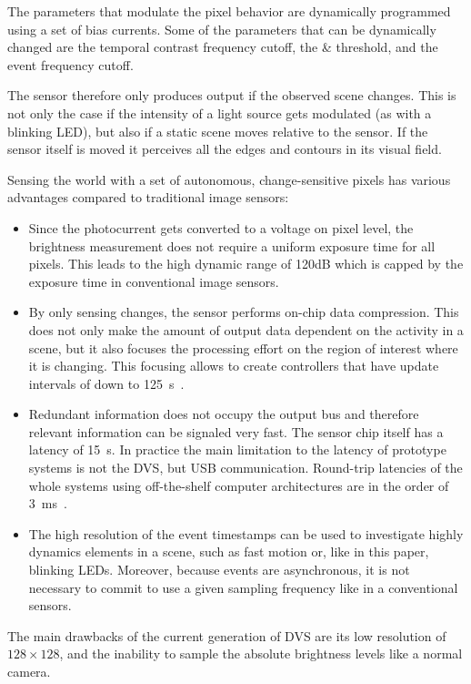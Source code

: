 The parameters that modulate the pixel behavior are dynamically programmed
using a set of bias currents. Some of the parameters that can be dynamically
changed are the temporal contrast frequency cutoff, the \pP \& \pN
threshold, and the event frequency cutoff. 

The sensor therefore only produces output if the observed scene changes.
This is not only the case if the intensity of a light source gets
modulated (as with a blinking LED), but also if a static scene moves
relative to the sensor. If the sensor itself is moved it perceives
all the edges and contours in its visual field.

Sensing the world with a set of autonomous, change-sensitive pixels
has various advantages compared to traditional image sensors:
\begin{itemize}
\item Since the photocurrent gets converted to a voltage on pixel level,
the brightness measurement does not require a uniform exposure time
for all pixels. This leads to the high dynamic range of 120dB which
is capped by the exposure time in conventional image sensors.
\item By only sensing changes, the sensor performs on-chip data compression.
This does not only make the amount of output data dependent on the
activity in a scene, but it also focuses the processing effort on
the region of interest where it is changing. This focusing allows
to create controllers that have update intervals of down to 125~\textmu{}s~\cite{conradt09pencil}.
\item Redundant information does not occupy the output bus and therefore
relevant information can be signaled very fast. The sensor chip itself
has a latency of 15~\textmu{}s. In practice the main limitation to
the latency of prototype systems is not the DVS, but USB communication.
Round-trip latencies of the whole systems using off-the-shelf computer
architectures are in the order of 3~ms~\cite{delbruck07fast}.
\item The high resolution of the event timestamps can be used to investigate
highly dynamics elements in a scene, such as fast motion or, like
in this paper, blinking LEDs. Moreover, because events are asynchronous,
it is not necessary to commit to use a given sampling frequency like
in a conventional sensors.
\end{itemize}
The main drawbacks of the current generation of DVS are its low resolution
of $128\times128$, and the inability to sample the absolute brightness
levels like a normal camera. \xxx

